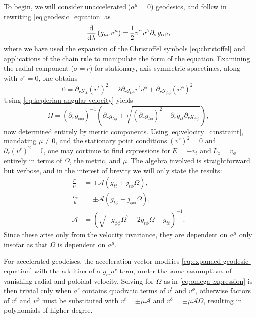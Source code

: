To begin, we will consider unaccelerated ($a^\mu = 0$) geodesics, and follow \cite{johannsen_regular_2013} in rewriting \eqref{eq:geodesic_equation} as
\begin{equation}
    \frac{\text{d}}{\text{d} \lambda}\left( g_{\mu\sigma}v^\mu \right) = \frac{1}{2} v^\alpha v^\beta \partial_\sigma g_{\alpha \beta},
\end{equation}
where we have used the expansion of the Christoffel symbols \eqref{eq:christoffel} and applications of the chain rule to manipulate the form of the equation. Examining the radial component ($\sigma = r$) for stationary, axis-symmetric spacetimes, along with $v^r = 0$, one obtains
\begin{equation}
    \label{eq:expanded-geodesic-equation}
    0 =
    \partial_r g_{tt} (v^t)^2
    + 2\partial_r g_{t\phi} v^t v^\phi
    + \partial_r g_{\phi\phi} (v^\phi)^2.
\end{equation}
Using \eqref{eq:keplerian-angular-velocity} yields
\begin{equation}
    \label{eq:omega-expression}
    \Omega =
    \left( \partial_r g_{\phi\phi} \right)^{-1}\left( \partial_r g_{t\phi} \pm \sqrt{\left( \partial_r g_{t\phi} \right)^2 - \partial_r g_{tt} \partial_r g_{\phi\phi}} \right),
\end{equation}
now determined entirely by metric components. Using \eqref{eq:velocity_constraint}, mandating $\mu \neq 0$, and the stationary point conditions $(v^r)^2 = 0$ and $\partial_r (v^r)^2 = 0$, one may continue to find expressions for $E = -v_t$ and $L_z = v_\phi$ entirely in terms of $\Omega$, the metric, and $\mu$. The algebra involved is straightforward but verbose, and in the interest of brevity we will only state the results:
\begin{align}
    \frac{E}{\mu} &= \pm \mathcal{A} \left(g_{tt} + g_{t\phi}\Omega\right) , \label{eq:energy-of-orbit} \\
    \frac{L_z}{\mu} &= \pm \mathcal{A} \left(g_{t\phi} + g_{\phi\phi}\Omega\right), \\
    \mathcal{A} &= \left(\sqrt{-g_{\phi\phi} \Omega^2 - 2g_{t\phi} \Omega - g_{tt}}\right)^{-1}.
\end{align}
Since these arise only from the velocity invariance, they are dependent on $a^\mu$ only insofar as that $\Omega$ is dependent on $a^\mu$.

For accelerated geodeiscs, the acceleration vector modifies \eqref{eq:expanded-geodesic-equation} with the addition of a $g_{rr} a^r$ term, under the same assumptions of vanishing radial and poloidal velocity. Solving for $\Omega$ as in \eqref{eq:omega-expression} is then trivial only when $a^r$ contains quadratic terms of $v^t$ and $v^\phi$, otherwise factors of $v^t$ and $v^\phi$ must be substituted with $v^t = \pm \mu \mathcal{A}$ and $v^\phi = \pm \mu \mathcal{A} \Omega$, resulting in polynomials of higher degree.

